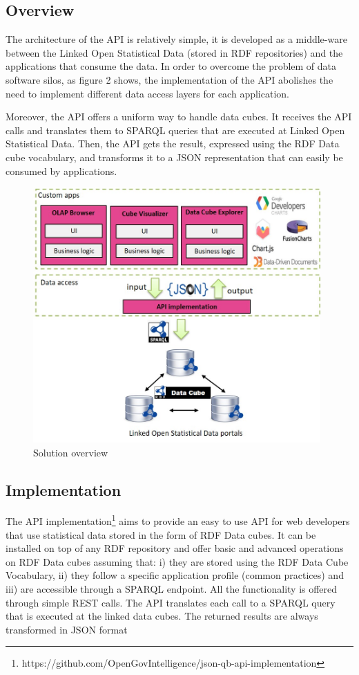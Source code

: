 \documentclass{llncs}
\begin{document}
\subsection{Overview}\label{sec:overview}

The architecture of the API is relatively simple, it is developed as a middle-ware between the Linked Open Statistical Data (stored in RDF repositories) and the applications that consume the data. In order to overcome the problem of data software silos, as figure 2 shows, the implementation of the API abolishes the need to implement different data access layers for each application.

Moreover, the API offers a uniform way to handle data cubes. It receives the API calls and translates them to SPARQL queries that are executed at Linked Open Statistical Data. Then, the API gets the result, expressed using the RDF Data cube vocabulary, and transforms it to a JSON representation that can easily be consumed by applications.


\begin{figure}[h!]
  \includegraphics[width=110mm]{images/overview.jpg}
\caption{Solution overview}
\label{fig:overview}
\end{figure}

\subsection{Implementation}\label{sec:impl}


The API implementation\footnote{https://github.com/OpenGovIntelligence/json-qb-api-implementation} aims to provide an easy to use API for web developers that use statistical data stored in the form of RDF Data cubes. It  can be installed on top of any RDF repository and offer basic and advanced operations on RDF Data cubes assuming that: i) they are stored using the RDF Data Cube Vocabulary, ii) they follow a specific application profile (common practices) and iii) are accessible through a SPARQL endpoint.  All the functionality is offered through simple REST calls. The API translates each call to a SPARQL query that is executed at the linked data cubes. The returned results are always transformed  in JSON format 
\end{document}
